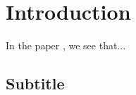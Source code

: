 \documentclass[11pt,a4paper]{report}
\begin{document}
\section{Introduction}
In the paper \cite[233]{Wang2016}, we see that...
\lipsum[1-3]


\subsection*{Subtitle}
\lipsum[4-5]
\printbibliography[heading = bibintoc, title={References}]
\end{document}
